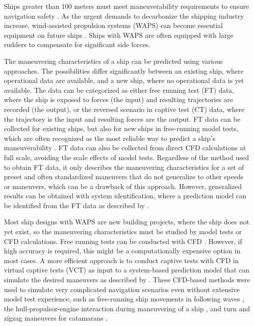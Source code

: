 Ships greater than 100 meters must meet maneuverability requirements to ensure navigation safety \citep{imoStandardsShipManoeuvrability2002}. As the urgent demands to decarbonize the shipping industry increase, wind-assisted propulsion systems (WAPS) can become essential equipment on future ships \citep{nelissenStudyAnalysisMarket2016}. Ships with WAPS are often equipped with large rudders to compensate for significant side forces.

The maneuvering characteristics of a ship can be predicted using various approaches. The possibilities differ significantly between an existing ship, where operational data are available, and a new ship, where no operational data is yet available. The data can be categorized as either free running test (FT) data, where the ship is exposed to forces (the input) and resulting trajectories are recorded (the output), or the reversed scenario in captive test (CT) data, where the trajectory is the input and resulting forces are the output. FT data can be collected for existing ships, but also for new ships in free-running model tests, which are often recognized as the most reliable way to predict a ship's maneuverability \citep{ittcITTCRecommendedProcedures2008}. FT data can also be collected from direct CFD calculations at full scale, avoiding the scale effects of model tests. Regardless of the method used to obtain FT data, it only describes the maneuvering characteristics for a set of preset and often standardized maneuvers \citep{imoStandardsShipManoeuvrability2002} that do not generalize to other speeds or maneuvers, which can be a drawback of this approach. However, generalized results can be obtained with system identification, where a prediction model can be identified from the FT data as described by \citet{luoParameterIdentificationShip2016, xuUncertaintyAnalysisHydrodynamic2019, wangOptimalDesignExcitation2020, alexanderssonSystemIdentificationVessel2022, haoRecurrentNeuralNetworks2022a, kimValidation4DOFManeuvering2024, alexanderssonSystemIdentificationPhysicsinformed2024b}.

Most ship designs with WAPS are new building projects, where the ship does not yet exist, so the maneuvering characteristics must be studied by model tests or CFD calculations. Free running tests can be conducted with CFD \citep{sakamotoURANSSimulationsStatic2012, elmoctarRANSBasedSimulatedShip2014, dumanTurnZigzagManoeuvres2022}. However, if high accuracy is required, this might be a computationally expensive option in most cases. A more efficient approach is to conduct captive tests with CFD in virtual captive tests (VCT) as input to a system-based prediction model that can simulate the desired maneuvers as described by \citet{simonsenKCSPMMTests2014, elmoctarRANSBasedSimulatedShip2014, hajivandVirtualSimulationManeuvering2015, yoonBenchmarkCFDValidation2015c, liuPredictionsShipManeuverability2018}. These CFD-based methods were used to simulate very complicated navigation scenarios even without extensive model test experience, such as free-running ship movements in following waves \citep{Araki2019}, the hull-propulsor-engine interaction during maneuvering of a ship \citep{elmoctarRANSBasedSimulatedShip2014}, and turn and zigzag maneuvers for catamarans \citep{dumanTurnZigzagManoeuvres2022}.

